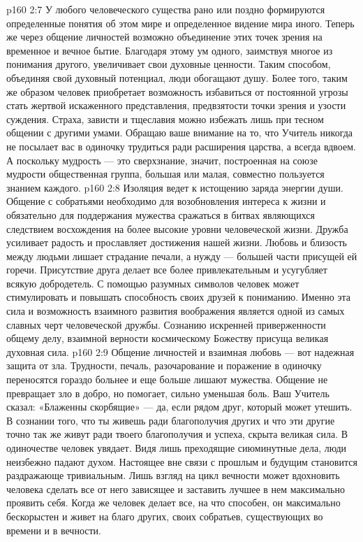 \vs p160 2:7 \pc {}\bibnobreakspace {} У любого человеческого существа рано или поздно формируются определенные понятия об этом мире и определенное видение мира иного. Теперь же через общение личностей возможно объединение этих точек зрения на временное и вечное бытие. Благодаря этому ум одного, заимствуя многое из понимания другого, увеличивает свои духовные ценности. Таким способом, объединяя свой духовный потенциал, люди обогащают душу. Более того, таким же образом человек приобретает возможность избавиться от постоянной угрозы стать жертвой искаженного представления, предвзятости точки зрения и узости суждения. Страха, зависти и тщеславия можно избежать лишь при тесном общении с другими умами. Обращаю ваше внимание на то, что Учитель никогда не посылает вас в одиночку трудиться ради расширения царства, а всегда вдвоем. А поскольку мудрость --- это сверхзнание, значит, построенная на союзе мудрости общественная группа, большая или малая, совместно пользуется знанием каждого.
\vs p160 2:8 \pc {}\bibnobreakspace {} Изоляция ведет к истощению заряда энергии души. Общение с собратьями необходимо для возобновления интереса к жизни и обязательно для поддержания мужества сражаться в битвах являющихся следствием восхождения на более высокие уровни человеческой жизни. Дружба усиливает радость и прославляет достижения нашей жизни. Любовь и близость между людьми лишает страдание печали, а нужду --- большей части присущей ей горечи. Присутствие друга делает все более привлекательным и усугубляет всякую добродетель. С помощью разумных символов человек может стимулировать и повышать способность своих друзей к пониманию. Именно эта сила и возможность взаимного развития воображения является одной из самых славных черт человеческой дружбы. Сознанию искренней приверженности общему делу, взаимной верности космическому Божеству присуща великая духовная сила.
\vs p160 2:9 \pc {}\bibnobreakspace {} Общение личностей и взаимная любовь --- вот надежная защита от зла. Трудности, печаль, разочарование и поражение в одиночку переносятся гораздо больнее и еще больше лишают мужества. Общение не превращает зло в добро, но помогает, сильно уменьшая боль. Ваш Учитель сказал: «Блаженны скорбящие» --- да, если рядом друг, который может утешить. В сознании того, что ты живешь ради благополучия других и что эти другие точно так же живут ради твоего благополучия и успеха, скрыта великая сила. В одиночестве человек увядает. Видя лишь преходящие сиюминутные дела, люди неизбежно падают духом. Настоящее вне связи с прошлым и будущим становится раздражающе тривиальным. Лишь взгляд на цикл вечности может вдохновить человека сделать все от него зависящее и заставить лучшее в нем максимально проявить себя. Когда же человек делает все, на что способен, он максимально бескорыстен и живет на благо других, своих собратьев, существующих во времени и в вечности.
